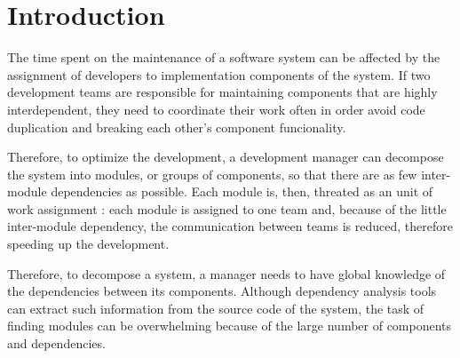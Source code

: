 \section{Introduction} \label{sec:introduction}

%

%
The time spent on the maintenance of a software system can be affected by the
assignment of developers to implementation components of the system.
If two development teams are responsible for maintaining components that are
highly interdependent, they need to coordinate their work often in order avoid
code duplication and breaking each other's component funcionality.

%

Therefore, to optimize the development, a development manager can decompose the
system into modules, or groups of components, so that there are as few
inter-module dependencies as possible.%
Each module is, then, threated as an unit of work assignment \cite{Parnas1972}:
each module is assigned to one team and, because of the little inter-module
dependency, the communication between teams is reduced, therefore speeding up
the development.

Therefore, to decompose a system, a manager needs to have global knowledge of
the dependencies between its components. Although dependency analysis tools can
extract such information from the source code of the system, the task of finding
modules can be overwhelming because of the large number of components and
dependencies.


